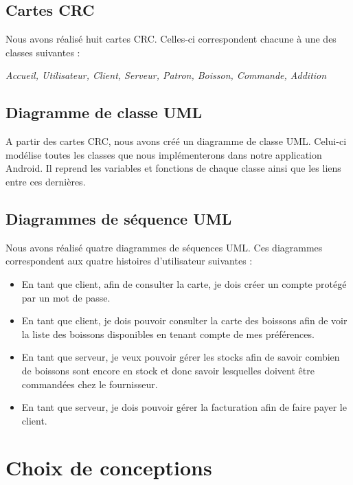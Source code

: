 \documentclass[11pt, a4, oneside, headings=normal]{scrreprt}
\begin{document}
\subsection*{Cartes CRC}

Nous avons réalisé huit cartes CRC. Celles-ci correspondent chacune à une des classes suivantes :

\begin{center}
\emph{Accueil, Utilisateur, Client, Serveur, Patron, Boisson, Commande, Addition}
\end{center}

\subsection*{Diagramme de classe UML}

A partir des cartes CRC, nous avons créé un diagramme de classe UML. Celui-ci modélise toutes les classes que nous implémenterons dans notre application Android. Il reprend les variables et fonctions de chaque classe ainsi que les liens entre ces dernières.

\subsection*{Diagrammes de séquence UML}

Nous avons réalisé quatre diagrammes de séquences UML. Ces diagrammes correspondent aux quatre histoires d'utilisateur suivantes : 

\begin{itemize}
\item En tant que client, afin de consulter la carte, je dois créer un compte protégé par un mot de passe.
\item En tant que client, je dois pouvoir consulter la carte des boissons afin de voir la liste des boissons disponibles en tenant compte de mes préférences.
\item En tant que serveur, je veux pouvoir gérer les stocks afin de savoir combien de boissons sont encore en stock et donc savoir lesquelles doivent être commandées chez le fournisseur.
\item En tant que serveur, je dois pouvoir gérer la facturation afin de faire payer le client.
\end{itemize}

\section*{Choix de conceptions}
\end{document}
